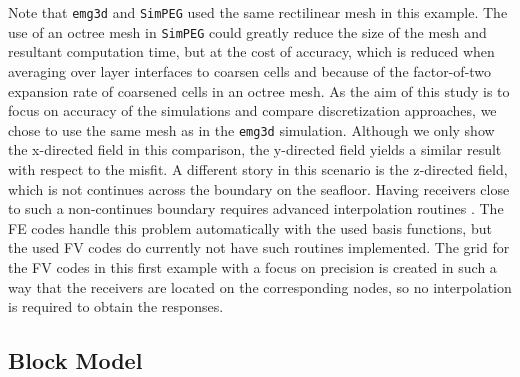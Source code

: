 \documentclass[extra, camera,%
]{gji}
\newcommand{\emg}[2]{\texttt{emg#1#2}\xspace}
\newcommand{\simpeg}{\texttt{SimPEG}\xspace}
\newcommand{\custem}{\texttt{custEM}\xspace}
\newcommand{\petgem}{\texttt{PETGEM}\xspace}
\begin{document}
Note that \emg3d and \simpeg used the same rectilinear mesh in this example. The use of an octree mesh in \simpeg could greatly reduce the size of the mesh and resultant computation time, but at the cost of accuracy, which is reduced when averaging over layer interfaces to coarsen cells and because of the factor-of-two expansion rate of coarsened cells in an octree mesh. As the aim of this study is to focus on accuracy of the simulations and compare discretization approaches, we chose to use the same mesh as in the \emg3d simulation. Although we only show the x-directed field in this comparison, the y-directed field yields a similar result with respect to the misfit. A different story in this scenario is the z-directed field, which is not continues across the boundary on the seafloor. Having receivers close to such a non-continues boundary requires advanced interpolation routines \citep[e.g., ][]{GJI.15.Shantsev, GP.11.Wirianto}. The FE codes handle this problem automatically with the used basis functions, but the used FV codes do currently not have such routines implemented. The grid for the FV codes in this first example with a focus on precision is created in such a way that the receivers are located on the corresponding nodes, so no interpolation is required to obtain the responses.

%

\subsection{Block Model}
\end{document}
